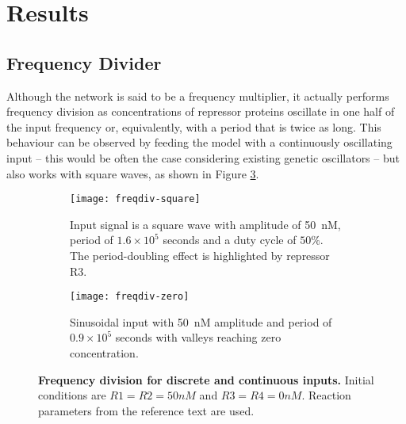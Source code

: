 

\section{Results}

  \subsection{Frequency Divider}

    Although the network is said to be a frequency multiplier, it actually performs frequency division as concentrations of repressor proteins oscillate in one half of the input frequency or, equivalently, with a period that is twice as long.
    This behaviour can be observed by feeding the model with a continuously oscillating input -- this would be often the case considering existing genetic oscillators -- but also works with square waves, as shown in Figure \ref{fig.freqdiv-square-zero}.

    \begin{figure}[!htb]
      \centering
      \begin{subfigure}[t]{0.4\textwidth}
        \centering
        \texttt{[image: freqdiv-square]}
        \caption{Input signal is a square wave with amplitude of \SI{50}{\nano M}, period of $1.6 \times 10^5$ seconds and a duty cycle of $50\%$. The period-doubling effect is highlighted by repressor R3.}
        \label{fig.freqdiv-square}
      \end{subfigure}
      \hspace{1em}
      \begin{subfigure}[t]{0.4\textwidth}
        \centering
        \texttt{[image: freqdiv-zero]}
        \caption{Sinusoidal input with \SI{50}{\nano M} amplitude and period of $0.9 \times 10^5$ seconds with valleys reaching zero concentration.}
        \label{fig.freqdiv-zero}
      \end{subfigure}
      \caption{\textbf{Frequency division for discrete and continuous inputs.} Initial conditions are $R1 = R2 = 50nM$ and $R3 = R4 = 0nM$. Reaction parameters from the reference text are used.}
      \label{fig.freqdiv-square-zero}
    \end{figure}

